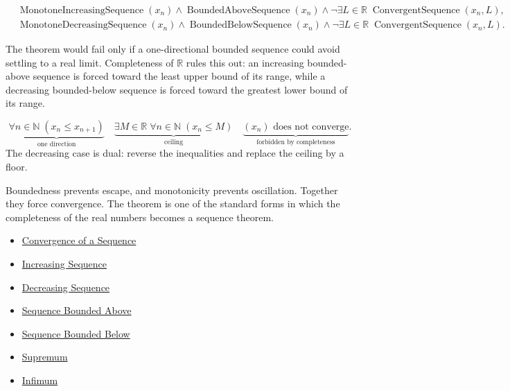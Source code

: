 \begin{remark*}
\[
\begin{aligned}
&\operatorname{MonotoneIncreasingSequence}(x_n)
\land
\operatorname{BoundedAboveSequence}(x_n)
\land
\neg\exists L\in\mathbb{R}\;\operatorname{ConvergentSequence}(x_n,L),\\
&\operatorname{MonotoneDecreasingSequence}(x_n)
\land
\operatorname{BoundedBelowSequence}(x_n)
\land
\neg\exists L\in\mathbb{R}\;\operatorname{ConvergentSequence}(x_n,L).
\end{aligned}
\]
\end{remark*}

\begin{remark*}
The theorem would fail only if a one-directional bounded sequence could avoid
settling to a real limit. Completeness of $\mathbb{R}$ rules this out: an
increasing bounded-above sequence is forced toward the least upper bound of
its range, while a decreasing bounded-below sequence is forced toward the
greatest lower bound of its range.
\end{remark*}

\begin{remark*}
\[
\underbrace{\forall n\in\mathbb{N}\;(x_n\le x_{n+1})}_{\text{one direction}}
\quad
\underbrace{\exists M\in\mathbb{R}\;\forall n\in\mathbb{N}\;(x_n\le M)}_{\text{ceiling}}
\quad
\underbrace{\text{$(x_n)$ does not converge}}_{\text{forbidden by completeness}}.
\]
The decreasing case is dual: reverse the inequalities and replace the
ceiling by a floor.
\end{remark*}

\begin{remark*}[Interpretation]
Boundedness prevents escape, and monotonicity prevents oscillation. Together
they force convergence. The theorem is one of the standard forms in which the
completeness of the real numbers becomes a sequence theorem.
\end{remark*}

\begin{dependencies}
\begin{itemize}
  \item \hyperref[def:convergent-sequence]{Convergence of a Sequence}
  \item \hyperref[def:increasing-sequence]{Increasing Sequence}
  \item \hyperref[def:decreasing-sequence]{Decreasing Sequence}
  \item \hyperref[def:sequence-bounded-above]{Sequence Bounded Above}
  \item \hyperref[def:sequence-bounded-below]{Sequence Bounded Below}
  \item \hyperref[def:supremum]{Supremum}
  \item \hyperref[def:infimum]{Infimum}
\end{itemize}
\end{dependencies}

